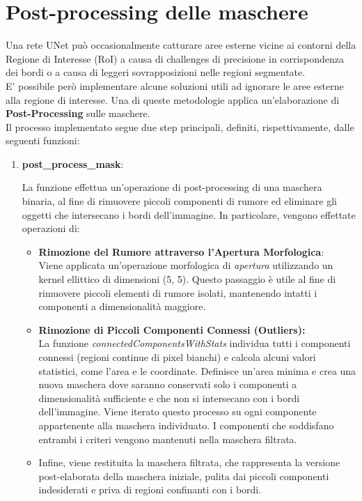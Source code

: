 \documentclass[12pt,a4paper,openright,twoside]{book}
\begin{document}
\section{Post-processing delle maschere} 
Una rete UNet può occasionalmente catturare aree esterne vicine ai contorni della Regione di Interesse (RoI) a causa di challenges di precisione in corrispondenza dei bordi o a causa di leggeri sovrapposizioni nelle regioni segmentate.\\
E' possibile però implementare alcune soluzioni utili ad ignorare le aree esterne alla regione di interesse. Una di queste metodologie applica un'elaborazione di \textbf{Post-Processing} sulle maschere.\\
Il processo implementato segue due step principali, definiti, rispettivamente, dalle seguenti funzioni:
\begin{enumerate}
\item \textbf{post\_process\_mask}:
\begin{figure}[H]
    \centering
    
\end{figure}

La funzione effettua un'operazione di post-processing di una maschera binaria, al fine di rimuovere piccoli componenti di rumore ed eliminare gli oggetti che intersecano i bordi dell'immagine. In particolare, vengono effettate operazioni di:
\begin{itemize}
\item \textbf{Rimozione del Rumore attraverso l’Apertura Morfologica}:\\
Viene applicata un'operazione morfologica di {\itshape apertura} utilizzando un kernel ellittico di dimensioni (5, 5). Questo passaggio è utile al fine di rimuovere piccoli elementi di rumore isolati, mantenendo intatti i componenti a dimensionalità maggiore.
\item \textbf{Rimozione di Piccoli Componenti Connessi (Outliers):}\\
La funzione {\itshape connectedComponentsWithStats} individua tutti i componenti connessi (regioni continue di pixel bianchi) e calcola alcuni valori statistici, come l'area e le coordinate. Definisce un'area minima e crea una nuova maschera dove saranno conservati solo i componenti a dimensionalità sufficiente e che non si intersecano con i bordi dell'immagine. Viene iterato questo processo su ogni componente appartenente alla maschera individuato. I componenti che soddisfano entrambi i criteri vengono mantenuti nella maschera filtrata.
\item Infine, viene restituita la maschera filtrata, che rappresenta la versione post-elaborata della maschera iniziale, pulita dai piccoli componenti indesiderati e priva di regioni confinanti con i bordi.
\end{itemize}


\end{enumerate}
\end{document}

